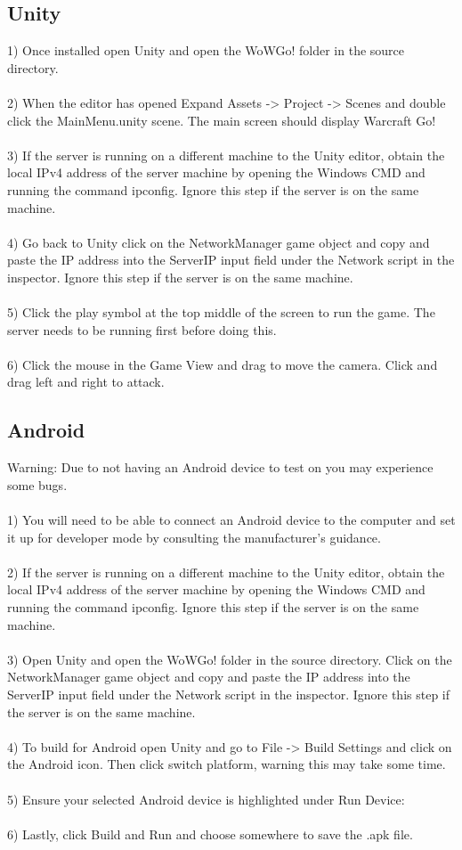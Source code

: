 \documentclass[a4paper]{report}
\begin{document}
\subsection{Unity}
1) Once installed open Unity and open the WoWGo! folder in the source directory. 
\\\\
2) When the editor has opened Expand Assets -> Project -> Scenes and double click the MainMenu.unity scene. The main screen should display Warcraft Go! 
\\\\
3) If the server is running on a different machine to the Unity editor, obtain the local IPv4 address of the server machine by opening the Windows CMD and running the command ipconfig. Ignore this step if the server is on the same machine.
\\\\
4) Go back to Unity click on the NetworkManager game object and copy and paste the IP address into the ServerIP input field under the Network script in the inspector. Ignore this step if the server is on the same machine.
\\\\
5) Click the play symbol at the top middle of the screen to run the game. The server needs to be running first before doing this.
\\\\
6) Click the mouse in the Game View and drag to move the camera. Click and drag left and right to attack.
\subsection{Android}
Warning: Due to not having an Android device to test on you may experience some bugs.
\\\\
1) You will need to be able to connect an Android device to the computer and set it up for developer mode by consulting the manufacturer's guidance.
\\\\
2) If the server is running on a different machine to the Unity editor, obtain the local IPv4 address of the server machine by opening the Windows CMD and running the command ipconfig. Ignore this step if the server is on the same machine.
\pagebreak
\\\\
3) Open Unity and open the WoWGo! folder in the source directory. Click on the NetworkManager game object and copy and paste the IP address into the ServerIP input field under the Network script in the inspector. Ignore this step if the server is on the same machine.
\\\\
4) To build for Android open Unity and go to File -> Build Settings and click on the Android icon. Then click switch platform, warning this may take some time.
\\\\
5) Ensure your selected Android device is highlighted under Run Device:
\\\\
6) Lastly, click Build and Run and choose somewhere to save the .apk file.
\end{document}
